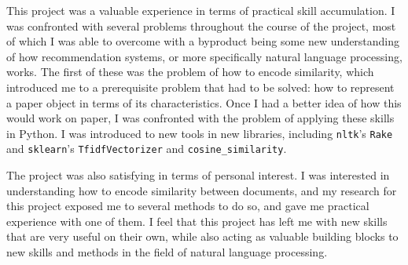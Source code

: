 \documentclass{article}
\begin{document}
This project was a valuable experience in terms of practical skill accumulation. I was confronted with several problems throughout the course of the project, most of which I was able to overcome with a byproduct being some new understanding of how recommendation systems, or more specifically natural language processing, works. The first of these was the problem of how to encode similarity, which introduced me to a prerequisite problem that had to be solved: how to represent a paper object in terms of its characteristics. Once I had a better idea of how this would work on paper, I was confronted with the problem of applying these skills in Python. I was introduced to new tools in new libraries, including \texttt{nltk}'s \texttt{Rake} and \texttt{sklearn}'s \texttt{TfidfVectorizer} and \texttt{cosine\_similarity}. \newpage

The project was also satisfying in terms of personal interest. I was interested in understanding how to encode similarity between documents, and my research for this project exposed me to several methods to do so, and gave me practical experience with one of them. I feel that this project has left me with new skills that are very useful on their own, while also acting as valuable building blocks to new skills and methods in the field of natural language processing.

\printbibliography{}
\end{document}
